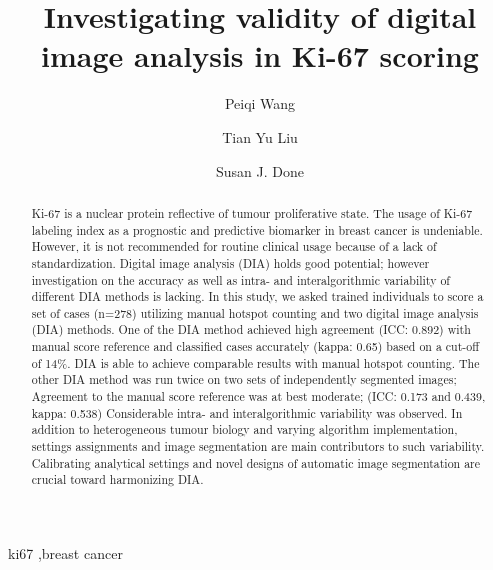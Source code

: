 \documentclass[final,5p,times,twocolumn]{elsarticle}
\begin{document}
\begin{frontmatter}

\title{Investigating validity of digital image analysis in Ki-67 scoring}
\author[molgen]{Peiqi Wang}
\author[music]{Tian Yu Liu}
\author[cf]{Susan J. Done}
\address[molgen]{Department of Molecular Genetics and Microbiology, University of Toronto, Canada}
\address[music]{Faculty of Music, Univeristy of Toronto, ON, Canada}
\address[cf]{The Campbell Family Institute for Breast Cancer Research, Canada}

\begin{abstract}
Ki-67 is a nuclear protein reflective of tumour proliferative state. The usage of Ki-67 labeling index as a prognostic and predictive biomarker in breast cancer is undeniable. However, it is not recommended for routine clinical usage because of a lack of standardization. Digital image analysis (DIA) holds good potential; however investigation on the accuracy as well as intra- and interalgorithmic variability of different DIA methods is lacking. In this study, we asked trained individuals to score a set of cases (n=278) utilizing manual hotspot counting and two digital image analysis (DIA) methods. One of the DIA method achieved high agreement (ICC: 0.892) with manual score reference and classified cases accurately (kappa: 0.65) based on a cut-off of 14\%. DIA is able to achieve comparable results with manual hotspot counting. The other DIA method was run twice on two sets of independently segmented images; Agreement to the manual score reference was at best moderate; (ICC: 0.173 and 0.439, kappa: 0.538) Considerable intra- and interalgorithmic variability was observed. In addition to heterogeneous tumour biology and varying algorithm implementation, settings assignments and image segmentation are main contributors to such variability. Calibrating analytical settings and novel designs of automatic image segmentation are crucial toward harmonizing DIA.


\end{abstract}

\begin{keyword}
ki67 \sep breast cancer
\end{keyword}

\end{frontmatter}

\linenumbers
\end{document}
